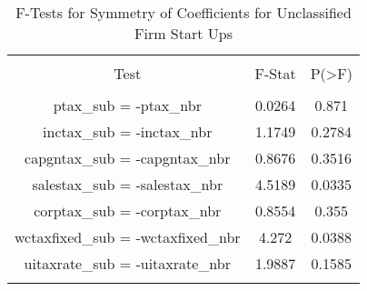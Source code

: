 
\begin{table}[!htbp] \centering 
  \caption{F-Tests for Symmetry of Coefficients for Unclassified Firm Start Ups} 
  \label{99Ftests} 
\begin{tabular}{@{\extracolsep{5pt}} ccc} 
\\[-1.8ex]\hline 
\hline \\[-1.8ex] 
Test & F-Stat & P(\textgreater F) \\ 
\hline \\[-1.8ex] 
ptax\_sub = -ptax\_nbr & 0.0264 & 0.871 \\ 
inctax\_sub = -inctax\_nbr & 1.1749 & 0.2784 \\ 
capgntax\_sub = -capgntax\_nbr & 0.8676 & 0.3516 \\ 
salestax\_sub = -salestax\_nbr & 4.5189 & 0.0335 \\ 
corptax\_sub = -corptax\_nbr & 0.8554 & 0.355 \\ 
wctaxfixed\_sub = -wctaxfixed\_nbr & 4.272 & 0.0388 \\ 
uitaxrate\_sub = -uitaxrate\_nbr & 1.9887 & 0.1585 \\ 
\hline \\[-1.8ex] 
\end{tabular} 
\end{table} 
